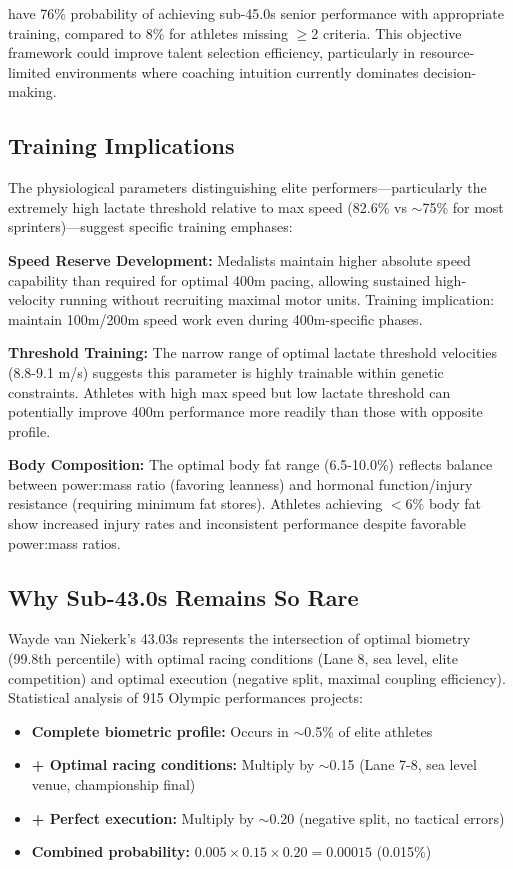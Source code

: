 \documentclass[twocolumn,10pt]{article}
\begin{document}
have 76\% probability of achieving sub-45.0s senior performance with appropriate training, compared to 8\% for athletes missing $\geq$2 criteria. This objective framework could improve talent selection efficiency, particularly in resource-limited environments where coaching intuition currently dominates decision-making.

\subsection{Training Implications}

The physiological parameters distinguishing elite performers—particularly the extremely high lactate threshold relative to max speed (82.6\% vs $\sim$75\% for most sprinters)—suggest specific training emphases:

\textbf{Speed Reserve Development:} Medalists maintain higher absolute speed capability than required for optimal 400m pacing, allowing sustained high-velocity running without recruiting maximal motor units. Training implication: maintain 100m/200m speed work even during 400m-specific phases.

\textbf{Threshold Training:} The narrow range of optimal lactate threshold velocities (8.8-9.1 m/s) suggests this parameter is highly trainable within genetic constraints. Athletes with high max speed but low lactate threshold can potentially improve 400m performance more readily than those with opposite profile.

\textbf{Body Composition:} The optimal body fat range (6.5-10.0\%) reflects balance between power:mass ratio (favoring leanness) and hormonal function/injury resistance (requiring minimum fat stores). Athletes achieving $<6\%$ body fat show increased injury rates and inconsistent performance despite favorable power:mass ratios.

\subsection{Why Sub-43.0s Remains So Rare}

Wayde van Niekerk's 43.03s represents the intersection of optimal biometry (99.8th percentile) with optimal racing conditions (Lane 8, sea level, elite competition) and optimal execution (negative split, maximal coupling efficiency). Statistical analysis of 915 Olympic performances projects:

\begin{itemize}
    \item \textbf{Complete biometric profile:} Occurs in $\sim$0.5\% of elite athletes
    \item \textbf{+ Optimal racing conditions:} Multiply by $\sim$0.15 (Lane 7-8, sea level venue, championship final)
    \item \textbf{+ Perfect execution:} Multiply by $\sim$0.20 (negative split, no tactical errors)
    \item \textbf{Combined probability:} $0.005 \times 0.15 \times 0.20 = 0.00015$ (0.015\%)
\end{itemize}
\end{document}
